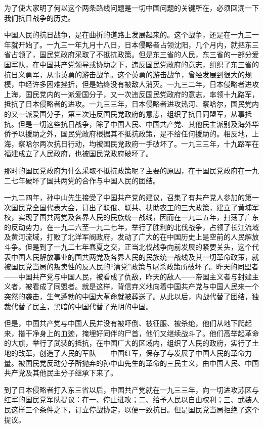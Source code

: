 为了使大家明了何以这个两条路线问题是一切中国问题的关键所在，必须回溯一下我们抗日战争的历史。

中国人民的抗日战争，是在曲折的道路上发展起来的。这个战争，还是在一九三一年就开始了。一九三一年九月十八日，日本侵略者占领沈阳，几个月内，就把东三省占领了，国民党政府采取了不抵抗政策。但是东三省的人民，东三省的一部分爱国军队，在中国共产党领导或协助之下，违反国民党政府的意志，组织了东三省的抗日义勇军，从事英勇的游击战争。这个英勇的游击战争，曾经发展到很大的规模，中经许多困难挫折，但是始终没有被敌人消灭。一九三二年，日本侵略者进攻上海，国民党内的一派爱国分子，又一次违反国民党政府的意志，率领十九路军，抵抗了日本侵略者的进攻。一九三三年，日本侵略者进攻热河、察哈尔，国民党内的又一派爱国分子，第三次违反国民党政府的意志，组织了抗日同盟军，从事抵抗。但是一切这些抗日战争，除了中国人民、中国共产党、其他民主派别及海外华侨予以援助之外，国民党政府根据其不抵抗政策，是不给任何援助的。相反地，上海，察哈尔两次抗日行动，均被国民党政府一手破坏了。一九三三年，十九路军在福建成立了人民政府，也被国民党政府破坏了。

那时的国民党政府为什么采取不抵抗政策呢？主要的原因，在于国民党政府在一九二七年破坏了国共两党的合作与中国人民的团结。

一九二四年，孙中山先生接受了中国共产党的建议，召集了有共产党人参加的第一次国民党全国代表大会，订出了联俄、联共、扶助农工的三大政策，建立了黄埔军校，实现了国共两党及各界人民的民族统一战线，因而在一九二五年，扫荡了广东的反动势力，在一九二六至一九二七年，举行了胜利的北伐战争，占领了长江流域及黄河流域，打败了北洋军阀政府，发动了广大的在中国历史上是空前的人民解放斗争。但是到了一九二七年春夏之交，正当北伐战争向前发展的紧要关头，这个代表中国人民解放事业的国共两党及各界人民的民族统一战线及其一切革命政策，就被国民党当局的叛卖性的反人民的“清党”政策与屠杀政策所破坏了。昨天的同盟者——中国共产党与中国人民，被看成了仇敌，昨天的敌人——帝国主义者与封建主义者，被看成了同盟者。就是这样，背信弃义地向着中国共产党与中国人民来一个突然的袭击，生气蓬勃的中国大革命就被葬送了。从此以后，内战代替了团结，独裁代替了民主，黑暗的中国代替了光明的中国。

但是，中国共产党与中国人民并没有被吓倒、被征服、被杀绝，他们从地下爬起来，揩干净身上的血迹，掩埋好同伴的尸首，他们又继续战斗了。他们高举起革命的大旗，举行了武装的抵抗，在中国广大的区域内，组织了人民的政府，实行了土地的改革，创造了人民的军队——中国红军，保存了与发展了中国人民的革命力量。被国民党反动分子所抛弃的孙中山先生的革命的三民主义，由中国人民、中国共产党及其他民主分子继承下来了。

到了日本侵略者打入东三省以后，中国共产党就在一九三三年，向一切进攻苏区与红军的国民党军队提议：在一、停止进攻；二、给予人民以自由权利；三、武装人民这样三个条件之下，订立停战协定，以便一致抗日。但是国民党当局拒绝了这个提议。

